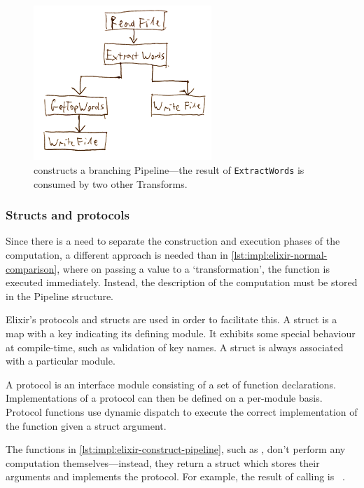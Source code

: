 \begin{figure}[h]
	\centering
	\includegraphics[width=0.6\textwidth]{images/temp/dsl-branching-pipeline}
	\caption[A branching Pipeline constructed in \cref{lst:impl:diverging-pipelines}.]{ constructs a branching Pipeline---the result of \texttt{ExtractWords} is consumed by two other Transforms.}
	\label{fig:impl:dsl-branching-pipeline}
\end{figure}

\subsubsection{Structs and protocols}

Since there is a need to separate the construction and execution phases of the computation, a different approach is needed than in \cref{lst:impl:elixir-normal-comparison}, where on passing a value to a `transformation', the function is executed immediately.
Instead, the description of the computation must be stored in the Pipeline structure.

Elixir's protocols and structs are used in order to facilitate this.
A struct is a map with a  key indicating its defining module.
It exhibits some special behaviour at compile-time, such as validation of key names.
A struct is always associated with a particular module.

A protocol is an interface module consisting of a set of function declarations.
Implementations of a protocol can then be defined on a per-module basis.
Protocol functions use dynamic dispatch to execute the correct implementation of the function given a struct argument.

\begin{sloppypar}
The functions in \cref{lst:impl:elixir-construct-pipeline}, such as , don't perform any computation themselves---instead, they return a struct which stores their arguments and implements the  protocol.
For example, the result of calling  is \texttt{%
}.
\end{sloppypar}

